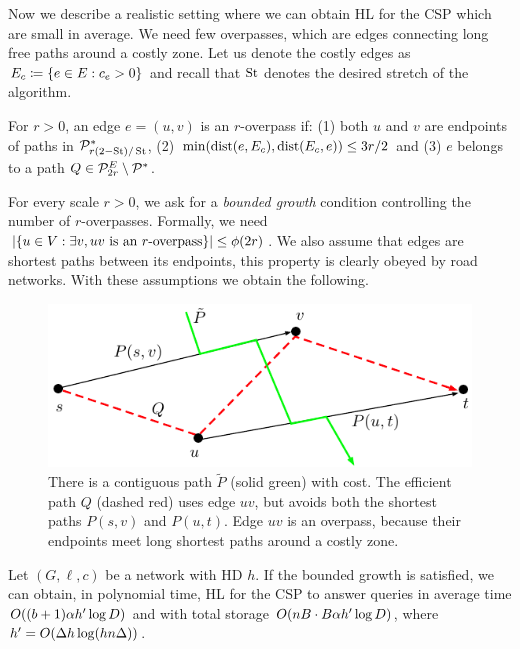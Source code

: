 Now we describe a realistic setting where we can obtain HL for the CSP which are small in average.
We need few overpasses, which are edges connecting long free paths around a costly zone.
Let us denote the costly edges as $E_c\coloneqq\{e\in E:c_e>0\}$ and recall that $\operatorname{St}$ denotes the desired stretch of the algorithm.

\begin{definition}[Overpass]
For $r>0$, an edge $e=(u,v)$ is an $r$-overpass if: (1) both $u$ and $v$ are endpoints of paths in $\mathcal{P}^*_{r(2-\operatorname{St})/\operatorname{St}}$, (2) $\min(\mbox{dist}(e,E_c),\mbox{dist}(E_c,e))\leq 3r/2$ and (3) $e$ belongs to a path $Q\in\mathcal{P}^E_{2r}\setminus\mathcal{P}^*$.
\end{definition} 

For every scale $r>0$, we ask for a \emph{bounded growth} condition controlling the number of $r$-overpasses.
Formally, we need $\lvert\{u\in V: \exists v, uv \text{ is an $r$-overpass}\}\rvert\leq \phi(2r)$.
We also assume that edges are shortest paths between its endpoints, this property is clearly obeyed by road networks.
With these assumptions we obtain the following.

\begin{figure}
\includegraphics[scale=0.7]{TexImg/overpass.pdf}
\caption{There is a contiguous path $\tilde P$ (solid green) with cost. 
The efficient path $Q$ (dashed red) uses edge $uv$, but avoids both the shortest paths $P(s,v)$ and $P(u,t)$.
Edge $uv$ is an overpass, because their endpoints meet long shortest paths around a costly zone.} 
\label{fig:overpass}
\end{figure}

\begin{theorem}\label{theo:overpasses}
Let $(G,\ell,c)$ be a network with HD $h$.
If the bounded growth is satisfied, we can obtain, in polynomial time, HL for the CSP to answer queries in average time $O((b+1)\alpha h'\log D)$ and with total storage $O(nB\cdot B\alpha h'\log D)$, where $h'=O(\Delta h\log(hn\Delta))$.
\end{theorem}

